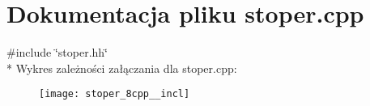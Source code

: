 \section{Dokumentacja pliku stoper.\+cpp}
\label{stoper_8cpp}
{\ttfamily \#include \char`\"{}stoper.\+hh\char`\"{}}\\*
Wykres zależności załączania dla stoper.\+cpp\+:\nopagebreak
\begin{figure}[H]
\begin{center}
\leavevmode
\texttt{[image: stoper\_8cpp\_\_incl]}
\end{center}
\end{figure}
